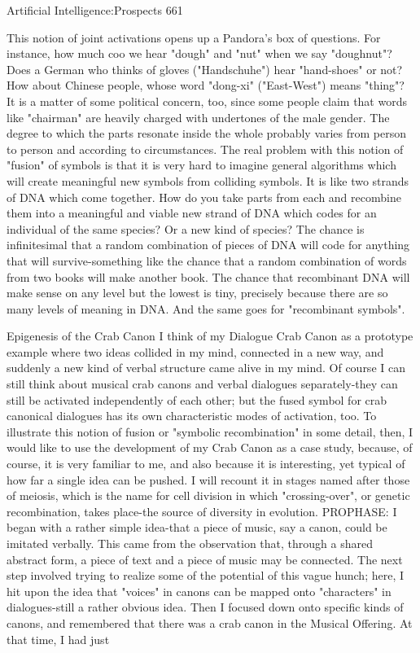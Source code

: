 Artificial Intelligence:Prospects                                                       661

        This notion of joint activations opens up a Pandora's box of questions. For
instance, how much coo we hear "dough" and "nut" when we say "doughnut"? Does a
German who thinks of gloves ("Handschuhe") hear "hand-shoes" or not? How about
Chinese people, whose word "dong-xi" ("East-West") means "thing"? It is a matter of
some political concern, too, since some people claim that words like "chairman" are
heavily charged with undertones of the male gender. The degree to which the parts
resonate inside the whole probably varies from person to person and according to
circumstances.
        The real problem with this notion of "fusion" of symbols is that it is very hard to
imagine general algorithms which will create meaningful new symbols from colliding
symbols. It is like two strands of DNA which come together. How do you take parts from
each and recombine them into a meaningful and viable new strand of DNA which codes
for an individual of the same species? Or a new kind of species? The chance is
infinitesimal that a random combination of pieces of DNA will code for anything that
will survive-something like the chance that a random combination of words from two
books will make another book. The chance that recombinant DNA will make sense on
any level but the lowest is tiny, precisely because there are so many levels of meaning in
DNA. And the same goes for "recombinant symbols".

                           Epigenesis of the Crab Canon
I think of my Dialogue Crab Canon as a prototype example where two ideas collided in
my mind, connected in a new way, and suddenly a new kind of verbal structure came
alive in my mind. Of course I can still think about musical crab canons and verbal
dialogues separately-they can still be activated independently of each other; but the fused
symbol for crab canonical dialogues has its own characteristic modes of activation, too.
To illustrate this notion of fusion or "symbolic recombination" in some detail, then, I
would like to use the development of my Crab Canon as a case study, because, of course,
it is very familiar to me, and also because it is interesting, yet typical of how far a single
idea can be pushed. I will recount it in stages named after those of meiosis, which is the
name for cell division in which "crossing-over", or genetic recombination, takes place-the
source of diversity in evolution.
         PROPHASE: I began with a rather simple idea-that a piece of music, say a canon,
could be imitated verbally. This came from the observation that, through a shared abstract
form, a piece of text and a piece of music may be connected. The next step involved
trying to realize some of the potential of this vague hunch; here, I hit upon the idea that
"voices" in canons can be mapped onto "characters" in dialogues-still a rather obvious
idea.
         Then I focused down onto specific kinds of canons, and remembered that there
was a crab canon in the Musical Offering. At that time, I had just





